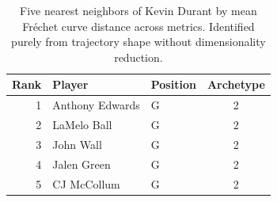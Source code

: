 \begin{table}[htbp]
  \centering\small
  \begin{tabular}{rllc}
    \toprule
    Rank & Player & Position & Archetype \\
    \midrule
    1 & Anthony Edwards & G & 2 \\
    2 & LaMelo Ball & G & 2 \\
    3 & John Wall & G & 2 \\
    4 & Jalen Green & G & 2 \\
    5 & CJ McCollum & G & 2 \\
    \bottomrule
  \end{tabular}
  \caption{Five nearest neighbors of Kevin Durant by mean Fr\'{e}chet curve distance across metrics. Identified purely from trajectory shape without dimensionality reduction.}
  \label{tab:Kevin_Durant_frechet_curve_neighbors}
\end{table}

